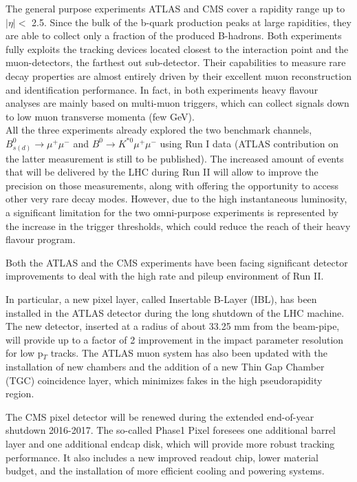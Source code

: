 The general purpose experiments ATLAS and CMS cover a rapidity range up to $|\eta | <$ 2.5.
Since the bulk of the b-quark production peaks at large rapidities, they are able to collect only a fraction of the produced B-hadrons.
Both experiments fully exploits the tracking devices located closest to the interaction point and the muon-detectors, the farthest out sub-detector. 
Their capabilities to measure rare decay properties are almost entirely driven by their excellent muon reconstruction and identification performance.
In fact, in both experiments heavy flavour analyses are mainly based on multi-muon triggers, which can collect signals down to low muon transverse momenta (few GeV). \\

All the three experiments already explored the two benchmark channels, $B^0_{s(d)} \to \mu^+\mu^-$ and $B^0 \to K^{\ast 0}\mu^+\mu^-$ using Run I data (ATLAS contribution on the latter measurement is still to be published).
The increased amount of events that will be delivered by the LHC during Run II will allow to improve the precision on those measurements, along with offering the opportunity to access other very rare decay modes.
However, due to the high instantaneous luminosity, a significant limitation for the two omni-purpose experiments is represented by the increase in the trigger thresholds, which could reduce the reach of their heavy flavour program.

Both the ATLAS and the CMS experiments have been facing significant detector improvements to deal with the high rate and pileup environment of Run II. 

In particular, a new pixel layer, called Insertable B-Layer (IBL), has been installed in the ATLAS detector during the long shutdown of the LHC machine. 
The new detector, inserted at a radius of about 33.25 mm from the beam-pipe, will provide up to a factor of 2 improvement in the impact parameter resolution for low p$_T$ tracks.
The ATLAS muon system has also been updated with the installation of new chambers and the addition of a new Thin Gap Chamber (TGC) coincidence layer, which minimizes fakes in the high pseudorapidity region.

The CMS pixel detector will be renewed during the extended end-of-year shutdown 2016-2017. 
The so-called Phase1 Pixel foresees one additional barrel layer and one additional endcap disk, which will provide more robust tracking performance. 
It also includes a new improved readout chip, lower material budget, and the installation of more efficient cooling and powering systems.\\


